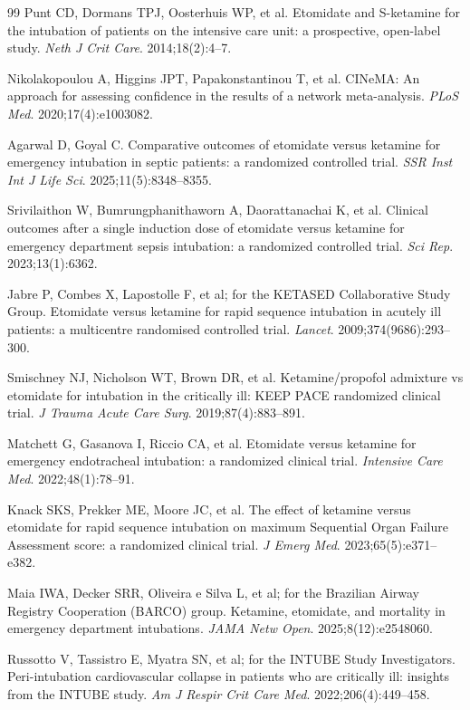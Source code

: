 \documentclass[11pt]{article}
\begin{document}
\begin{thebibliography}{99}
Punt CD, Dormans TPJ, Oosterhuis WP, et al.
Etomidate and S-ketamine for the intubation of patients on the intensive care unit: a prospective, open-label study.
\textit{Neth J Crit Care}. 2014;18(2):4--7.

Nikolakopoulou A, Higgins JPT, Papakonstantinou T, et al.
CINeMA: An approach for assessing confidence in the results of a network meta-analysis.
\textit{PLoS Med}. 2020;17(4):e1003082.

Agarwal D, Goyal C.
Comparative outcomes of etomidate versus ketamine for emergency intubation in septic patients: a randomized controlled trial.
\textit{SSR Inst Int J Life Sci}. 2025;11(5):8348--8355.

Srivilaithon W, Bumrungphanithaworn A, Daorattanachai K, et al.
Clinical outcomes after a single induction dose of etomidate versus ketamine for emergency department sepsis intubation: a randomized controlled trial.
\textit{Sci Rep}. 2023;13(1):6362.

Jabre P, Combes X, Lapostolle F, et al; for the KETASED Collaborative Study Group.
Etomidate versus ketamine for rapid sequence intubation in acutely ill patients: a multicentre randomised controlled trial.
\textit{Lancet}. 2009;374(9686):293--300.

Smischney NJ, Nicholson WT, Brown DR, et al.
Ketamine/propofol admixture vs etomidate for intubation in the critically ill: KEEP PACE randomized clinical trial.
\textit{J Trauma Acute Care Surg}. 2019;87(4):883--891.

Matchett G, Gasanova I, Riccio CA, et al.
Etomidate versus ketamine for emergency endotracheal intubation: a randomized clinical trial.
\textit{Intensive Care Med}. 2022;48(1):78--91.

Knack SKS, Prekker ME, Moore JC, et al.
The effect of ketamine versus etomidate for rapid sequence intubation on maximum Sequential Organ Failure Assessment score: a randomized clinical trial.
\textit{J Emerg Med}. 2023;65(5):e371--e382.

Maia IWA, Decker SRR, Oliveira e Silva L, et al; for the Brazilian Airway Registry Cooperation (BARCO) group.
Ketamine, etomidate, and mortality in emergency department intubations.
\textit{JAMA Netw Open}. 2025;8(12):e2548060.

Russotto V, Tassistro E, Myatra SN, et al; for the INTUBE Study Investigators.
Peri-intubation cardiovascular collapse in patients who are critically ill: insights from the INTUBE study.
\textit{Am J Respir Crit Care Med}. 2022;206(4):449--458.

\end{thebibliography}
\endgroup
\end{document}
